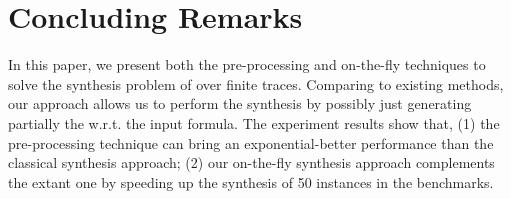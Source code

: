\section{Concluding Remarks}\label{sec:con}

In this paper, we present both the pre-processing and on-the-fly techniques to solve the synthesis problem of \ltl over finite traces. Comparing to existing methods, our approach allows us to perform the synthesis by possibly just generating partially the \dfa w.r.t. the input \ltlf formula. The experiment results show that, (1) the pre-processing technique can bring an exponential-better performance than the classical synthesis approach; (2) our on-the-fly synthesis approach complements the extant one by speeding up the synthesis of 50 instances in the benchmarks.  

